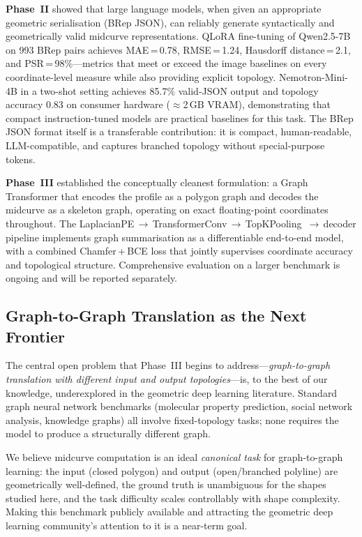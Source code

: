 \documentclass[journal]{IEEEtran}
\begin{document}
\textbf{Phase~II} showed that large language models, when given an appropriate
geometric serialisation (BRep JSON), can reliably generate syntactically and
geometrically valid midcurve representations.  QLoRA fine-tuning of
Qwen2.5-7B on 993 BRep pairs achieves MAE\,=\,0.78, RMSE\,=\,1.24,
Hausdorff distance\,=\,2.1, and PSR\,=\,98\%—metrics that meet or exceed
the image baselines on every coordinate-level measure while also providing
explicit topology.  Nemotron-Mini-4B in a two-shot setting achieves 85.7\%
valid-JSON output and topology accuracy 0.83 on consumer hardware
($\approx$2\,GB VRAM), demonstrating that compact instruction-tuned models
are practical baselines for this task.  The BRep JSON format itself is a
transferable contribution: it is compact, human-readable, LLM-compatible, and
captures branched topology without special-purpose tokens.

\textbf{Phase~III} established the conceptually cleanest formulation: a
Graph Transformer that encodes the profile as a polygon graph and decodes the
midcurve as a skeleton graph, operating on exact floating-point coordinates
throughout.  The LaplacianPE\,$\to$\,TransformerConv\,$\to$\,TopKPooling\,%
$\to$\,decoder pipeline implements graph summarisation as a differentiable
end-to-end model, with a combined Chamfer\,+\,BCE loss that jointly supervises
coordinate accuracy and topological structure.  Comprehensive evaluation on a
larger benchmark is ongoing and will be reported separately.

\subsection{Graph-to-Graph Translation as the Next Frontier}

The central open problem that Phase~III begins to address—\emph{graph-to-graph
translation with different input and output topologies}—is, to the best of our
knowledge, underexplored in the geometric deep learning literature.  Standard
graph neural network benchmarks (molecular property prediction, social network
analysis, knowledge graphs) all involve fixed-topology tasks; none requires the
model to produce a structurally different graph.

We believe midcurve computation is an ideal \emph{canonical task} for
graph-to-graph learning: the input (closed polygon) and output (open/branched
polyline) are geometrically well-defined, the ground truth is unambiguous for
the shapes studied here, and the task difficulty scales controllably with shape
complexity.  Making this benchmark publicly available and attracting the
geometric deep learning community's attention to it is a near-term goal.
\end{document}
